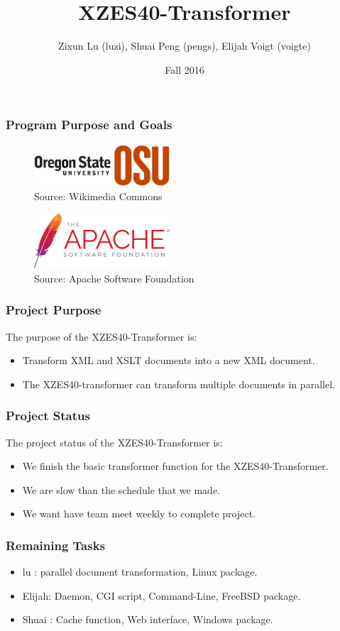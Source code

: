 \documentclass{beamer}
\title{XZES40-Transformer}
\author{Zixun Lu (luzi),
  Shuai Peng (pengs),
  Elijah Voigt (voigte)}
\institute{CS 461 | CS Senior Capstone | Group \#40}
\date{Fall 2016}
\begin{document}
 
\frame{\titlepage}

\begin{frame}
  \frametitle{Program Purpose and Goals }
\begin{figure}
	\centering
    \includegraphics[width=0.45\textwidth]{figures/osu-logo}
    \caption{Source: Wikimedia Commons \cite{osu-logo}}
\end{figure}

\begin{figure}
	\centering
    \includegraphics[width=0.45\textwidth]{figures/asf-logo}
    \caption{Source: Apache Software Foundation \cite{asf-logo}}
\end{figure}
\end{frame}

\begin{frame}
  \frametitle{Project Purpose}
  The purpose of the XZES40-Transformer is:
  \begin{itemize}
  \item Transform XML and XSLT documents into a new XML document.
  \item The XZES40-transformer can transform multiple documents in parallel. 
  \end{itemize}
\end{frame}

\begin{frame}
  \frametitle{Project Status}
  The project status of the XZES40-Transformer is:
  \begin{itemize}
    \item We finish the basic transformer function for the XZES40-Transformer.
    \item We are slow than the schedule that we made.
    \item We want have team meet weekly to complete project.
  \end{itemize}
\end{frame}

\begin{frame}
  \frametitle{Remaining Tasks}
  \begin{itemize}
    \item lu    : parallel document transformation, Linux package.
    \item Elijah: Daemon, CGI script, Command-Line, FreeBSD package.
    \item Shuai : Cache function, Web interface, Windows package.
  \end{itemize}
\end{frame}
\end{document}
